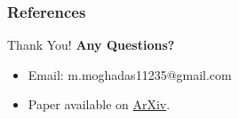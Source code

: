 \documentclass{beamer}
\begin{document}
\begin{frame}
	\frametitle{References}
	\nocite{*} %
	
	
\end{frame}

\begin{frame}{Thank You!}
	\textbf{Any Questions?}
	\begin{itemize}
		\item Email: m.moghadas11235@gmail.com
		\item Paper available on \href{https://arxiv.org/abs/2501.02637v2}{ArXiv}.
	\end{itemize}
\end{frame}
\end{document}
